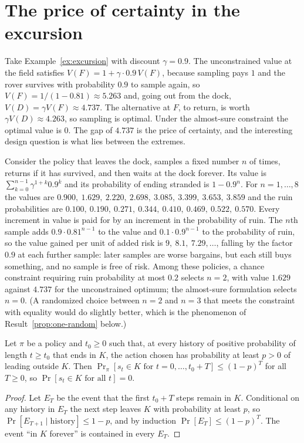 \section{The price of certainty in the excursion}\label{sec:price-certainty}

Take Example~\ref{ex:excursion} with discount $\gamma=0.9$. The unconstrained value at the field satisfies $V(F)=1+\gamma\cdot0.9\,V(F)$, because sampling pays $1$ and the rover survives with probability $0.9$ to sample again, so $V(F)=1/(1-0.81)\approx5.263$ and, going out from the dock, $V(D)=\gamma V(F)\approx4.737$. The alternative at $F$, to return, is worth $\gamma V(D)\approx4.263$, so sampling is optimal. Under the almost-sure constraint the optimal value is $0$. The gap of $4.737$ is the price of certainty, and the interesting design question is what lies between the extremes.

Consider the policy that leaves the dock, samples a fixed number $n$ of times, returns if it has survived, and then waits at the dock forever. Its value is $\sum_{k=0}^{n-1}\gamma^{1+k}0.9^{k}$ and its probability of ending stranded is $1-0.9^{n}$. For $n=1,\dots,8$ the values are $0.900,\ 1.629,\ 2.220,\ 2.698,\ 3.085,\ 3.399,\ 3.653,\ 3.859$ and the ruin probabilities are $0.100,\ 0.190,\ 0.271,\ 0.344,\ 0.410,\ 0.469,\ 0.522,\ 0.570$. Every increment in value is paid for by an increment in the probability of ruin. The $n$th sample adds $0.9\cdot0.81^{n-1}$ to the value and $0.1\cdot0.9^{n-1}$ to the probability of ruin, so the value gained per unit of added risk is $9,\ 8.1,\ 7.29,\dots$, falling by the factor $0.9$ at each further sample: later samples are worse bargains, but each still buys something, and no sample is free of risk. Among these policies, a chance constraint requiring ruin probability at most $0.2$ selects $n=2$, with value $1.629$ against $4.737$ for the unconstrained optimum; the almost-sure formulation selects $n=0$. (A randomized choice between $n=2$ and $n=3$ that meets the constraint with equality would do slightly better, which is the phenomenon of Result~\ref{prop:one-random} below.)

\begin{newresult}\label{prop:geometric-ruin}
Let $\pi$ be a policy and $t_0\ge0$ such that, at every history of positive probability of length $t\ge t_0$ that ends in $K$, the action chosen has probability at least $p>0$ of leading outside $K$. Then $\Pr_{\pi}[s_t\in K\text{ for }t=0,\dots,t_0+T]\le(1-p)^{T}$ for all $T\ge0$, so $\Pr[s_t\in K\text{ for all }t]=0$.
\end{newresult}
\begin{proof}
Let $E_T$ be the event that the first $t_0+T$ steps remain in $K$. Conditional on any history in $E_T$ the next step leaves $K$ with probability at least $p$, so $\Pr[E_{T+1}\mid\text{history}]\le1-p$, and by induction $\Pr[E_T]\le(1-p)^T$. The event ``in $K$ forever'' is contained in every $E_T$.
\end{proof}

